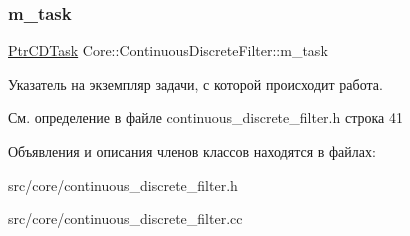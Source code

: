 \subsubsection{\texorpdfstring{m\+\_\+task}{m\_task}}
{\footnotesize\ttfamily \hyperlink{namespace_core_a4d5939b0284102299f3fb63d7552826a}{Ptr\+C\+D\+Task} Core\+::\+Continuous\+Discrete\+Filter\+::m\+\_\+task\hspace{0.3cm}{\ttfamily [protected]}}

Указатель на экземпляр задачи, с которой происходит работа. 

См. определение в файле continuous\+\_\+discrete\+\_\+filter.\+h строка 41



Объявления и описания членов классов находятся в файлах\+:\begin{DoxyCompactItemize}
\item 
src/core/continuous\+\_\+discrete\+\_\+filter.\+h\item 
src/core/continuous\+\_\+discrete\+\_\+filter.\+cc\end{DoxyCompactItemize}
